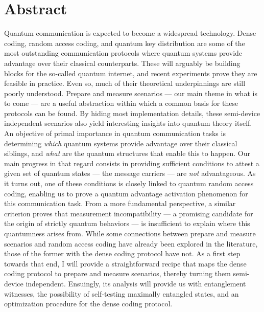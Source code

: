 \begingroup
\let\clearpage\relax

\chapter*{Abstract}
\thispagestyle{empty}

Quantum communication is expected to become a widespread technology. Dense coding, random access coding, and quantum key distribution are some of the most outstanding communication protocols where quantum systems provide advantage over their classical counterparts. These will arguably be building blocks for the so-called quantum internet, and recent experiments prove they are feasible in practice. Even so, much of their theoretical underpinnings are still poorly understood. Prepare and measure scenarios --- our main theme in what is to come --- are a useful abstraction within which a common basis for these protocols can be found. By hiding most implementation details, these semi-device independent scenarios also yield interesting insights into quantum theory itself. An objective of primal importance in quantum communication tasks is determining \emph{which} quantum systems provide advantage over their classical siblings, and \emph{what} are the quantum structures that enable this to happen. Our main progress in that regard consists in providing sufficient conditions to attest a given set of quantum states --- the message carriers --- are \emph{not} advantageous. As it turns out, one of these conditions is closely linked to quantum random access coding, enabling us to prove a quantum advantage activation phenomenon for this communication task. From a more fundamental perspective, a similar criterion proves that measurement incompatibility --- a promising candidate for the origin of strictly quantum behaviors --- is insufficient to explain where this quantumness arises from. While some connections between prepare and measure scenarios and random access coding have already been explored in the literature, those of the former with the dense coding protocol have not. As a first step towards that end, I will provide a straightforward recipe that maps the dense coding protocol to prepare and measure scenarios, thereby turning them semi-device independent. Ensuingly, its analysis will provide us with entanglement witnesses, the possibility of self-testing maximally entangled states, and an optimization procedure for the dense coding protocol.




